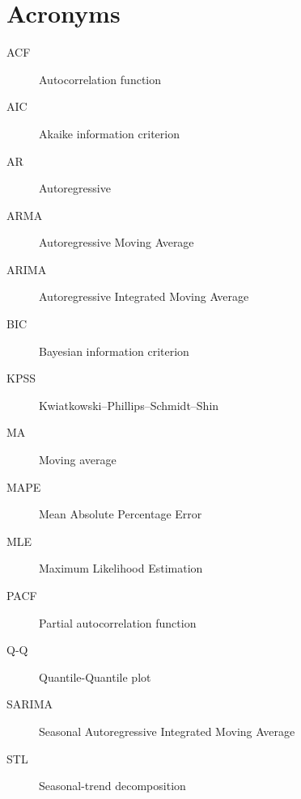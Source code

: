 \appendix

\chapter{Acronyms}
\begin{description}
    \item[ACF] Autocorrelation function
    \item[AIC] Akaike information criterion
	\item[AR] Autoregressive 
	\item[ARMA] Autoregressive Moving Average
	\item[ARIMA] Autoregressive Integrated Moving Average
	\item[BIC] Bayesian information criterion
	\item[KPSS] Kwiatkowski–Phillips–Schmidt–Shin
	\item[MA] Moving average
	\item[MAPE] Mean Absolute Percentage Error
	\item[MLE] Maximum Likelihood Estimation
	\item[PACF] Partial autocorrelation function
	\item[Q-Q] Quantile-Quantile plot
	\item[SARIMA] Seasonal Autoregressive Integrated Moving Average
	\item[STL] Seasonal-trend decomposition
\end{description}
